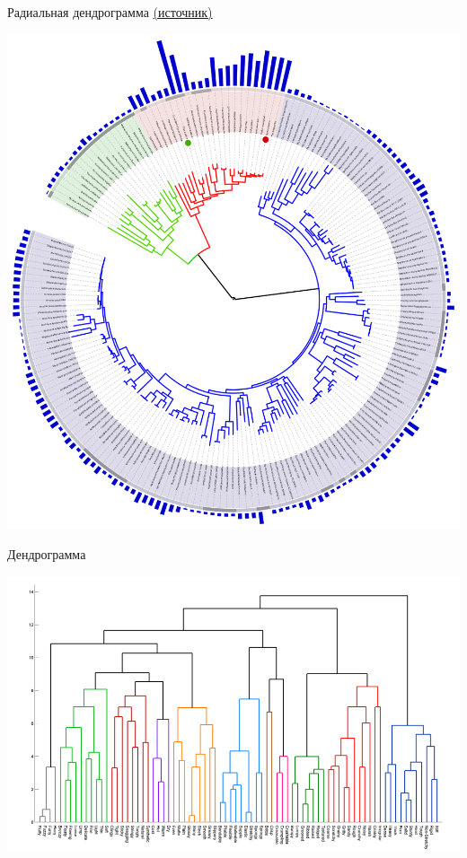 \documentclass[10pt]{beamer}
\begin{document}
\begin{frame}{Радиальная дендрограмма \href{http://itol.embl.de/}{(источник)}} 

\begin{center}
\includegraphics[scale=0.3]{images/radial.png}
\end{center}

\end{frame}

\begin{frame}{Дендрограмма}

\begin{center}
\includegraphics[scale=0.3]{images/dendro.png}
\end{center}

\end{frame}
\end{document}
